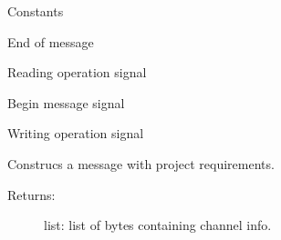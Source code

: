 \documentclass[letterpaper,10pt,english]{sphinxmanual}
\begin{document}
\begin{fulllineitems}
\label{\detokenize{code:reimaginedQuantum.Channel}}
Constants

\begin{fulllineitems}
\label{\detokenize{code:reimaginedQuantum.Channel.END_COMMUNICATION}}
End of message

\end{fulllineitems}


\begin{fulllineitems}
\label{\detokenize{code:reimaginedQuantum.Channel.READ_VALUE}}
Reading operation signal

\end{fulllineitems}


\begin{fulllineitems}
\label{\detokenize{code:reimaginedQuantum.Channel.START_COMMUNICATION}}
Begin message signal

\end{fulllineitems}


\begin{fulllineitems}
\label{\detokenize{code:reimaginedQuantum.Channel.WRITE_VALUE}}
Writing operation signal

\end{fulllineitems}


\begin{fulllineitems}
\label{\detokenize{code:reimaginedQuantum.Channel.construct_message}}
Construcs a message with project requirements.
\begin{description}
\item[{Returns:}] \leavevmode
list: list of bytes containing channel info.


\end{description}
\end{fulllineitems}
\end{fulllineitems}
\end{document}
